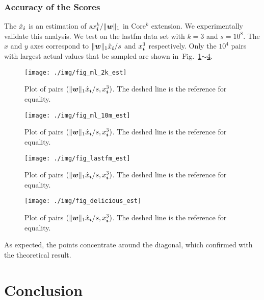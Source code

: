\documentclass[10pt,journal,compsoc]{IEEEtran}
\newcommand{\V}[1]{{\boldsymbol{{\MakeLowercase{#1}}}}}
\newcommand{\predx}{\hat{x}_{\V{i}}}
\newcommand{\norm}[2]{\|#1\|_{#2}}
\newcommand{\Figs}[2]{Fig.~\ref{fig:#1}$\sim$\ref{fig:#2}}
\begin{document}
\subsubsection{Accuracy of the Scores}
The $\predx$ is an estimation of $sx^k_{\V{i}}/\norm{\V{w}}{1}$ in Core$^k$ extension.
We experimentally validate this analysis.
We test on the lastfm data set with $k=3$ and $s=10^8$.
The $x$ and $y$ axes correspond to $\norm{\V{w}}{1}\hat{x}_{\V{i}}/s$ and $x^3_{\V{i}}$ respectively. 
Only the $10^4$ pairs with largest actual values that be sampled are shown in~\Figs{ml_2k_est}{delicious_est}.
\begin{figure}[H]
	\centering
	\texttt{[image: ./img/fig\_ml\_2k\_est]}\\
	\caption{Plot of pairs $(\norm{\V{w}}{1}\hat{x}_{\V{i}}/s,x^3_{\V{i}})$.
		The deshed line is the reference for equality.}
	\label{fig:ml_2k_est}
\end{figure}
\begin{figure}[H]
	\centering
	\texttt{[image: ./img/fig\_ml\_10m\_est]}\\
	\caption{Plot of pairs $(\norm{\V{w}}{1}\hat{x}_{\V{i}}/s,x^3_{\V{i}})$.
		The deshed line is the reference for equality.}
	\label{fig:ml_10m_est}
\end{figure}
\begin{figure}[H]
	\centering
	\texttt{[image: ./img/fig\_lastfm\_est]}\\
	\caption{Plot of pairs $(\norm{\V{w}}{1}\hat{x}_{\V{i}}/s,x^3_{\V{i}})$.
		The deshed line is the reference for equality.}
	\label{fig:lastfm_est}
\end{figure}
\begin{figure}[H]
	\centering
	\texttt{[image: ./img/fig\_delicious\_est]}\\
	\caption{Plot of pairs $(\norm{\V{w}}{1}\hat{x}_{\V{i}}/s,x^3_{\V{i}})$.
		The deshed line is the reference for equality.}
	\label{fig:delicious_est}
\end{figure}

As expected, the points concentrate around the diagonal, 
which confirmed with the theoretical result.


\section{}
\section{Conclusion}
\end{document}
